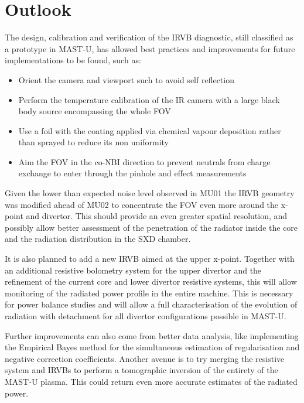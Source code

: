 \section{Outlook}\label{Outlook}


The design, calibration and verification of the IRVB diagnostic, still classified as a prototype in MAST-U, has allowed best practices and improvements for future implementations to be found, such as:

\begin{itemize}
    \item Orient the camera and viewport such to avoid self reflection
    \item Perform the temperature calibration of the IR camera with a large black body source encompassing the whole FOV
    \item Use a foil with the coating applied via chemical vapour deposition rather than sprayed to reduce its non uniformity
    \item Aim the FOV in the co-NBI direction to prevent neutrals from charge exchange to enter through the pinhole and effect measurements
\end{itemize}

Given the lower than expected noise level observed in MU01 the IRVB geometry was modified ahead of MU02 to concentrate the FOV even more around the x-point and divertor. This should provide an even greater spatial resolution, and possibly allow better assessment of the penetration of the radiator inside the core and the radiation distribution in the SXD chamber.

It is also planned to add a new IRVB aimed at the upper x-point. Together with an additional resistive bolometry system for the upper divertor and the refinement of the current core and lower divertor resistive systems, this will allow monitoring of the radiated power profile in the entire machine. This is necessary for power balance studies and will allow a full characterisation of the evolution of radiation with detachment for all divertor configurations possible in MAST-U.

Further improvements can also come from better data analysis, like implementing the Empirical Bayes method for the simultaneous estimation of regularisation and negative correction coefficients. Another avenue is to try merging the resistive system and IRVBs to perform a tomographic inversion of the entirety of the MAST-U plasma. This could return even more accurate estimates of the radiated power.

